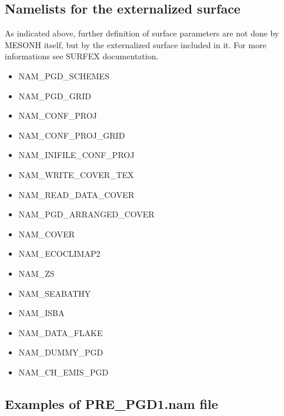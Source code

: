 \subsection{Namelists for the externalized surface}

As indicated above, further definition of surface parameters are not done by MESONH itself, but by the externalized surface included in it. For more informations see SURFEX documentation.\\

\begin{itemize}
\item NAM\_PGD\_SCHEMES
\item NAM\_PGD\_GRID
\item NAM\_CONF\_PROJ
\item NAM\_CONF\_PROJ\_GRID
\item NAM\_INIFILE\_CONF\_PROJ
\item NAM\_WRITE\_COVER\_TEX
\item NAM\_READ\_DATA\_COVER
\item NAM\_PGD\_ARRANGED\_COVER
\item NAM\_COVER
\item NAM\_ECOCLIMAP2
\item NAM\_ZS
\item NAM\_SEABATHY
\item NAM\_ISBA
\item NAM\_DATA\_FLAKE
\item NAM\_DUMMY\_PGD
\item NAM\_CH\_EMIS\_PGD
\end{itemize}

\subsection{Examples of PRE\_PGD1.nam file \label{example}}

